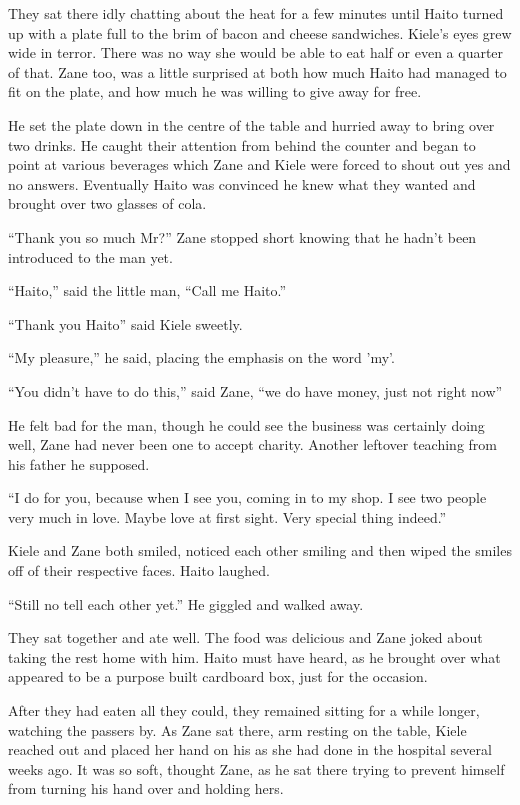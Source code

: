 They sat there idly chatting about the heat for a few minutes until Haito turned up with a plate full to the brim of bacon and cheese sandwiches.  Kiele's eyes grew wide in terror.  There was no way she would be able to eat half or even a quarter of that.  Zane too, was a little surprised at both how much Haito had managed to fit on the plate, and how much he was willing to give away for free.

He set the plate down in the centre of the table and hurried away to bring over two drinks.  He caught their attention from behind the counter and began to point at various beverages which Zane and Kiele were forced to shout out yes and no answers.  Eventually Haito was convinced he knew what they wanted and brought over two glasses of cola.  

``Thank you so much Mr?'' Zane stopped short knowing that he hadn't been introduced to the man yet.

``Haito,'' said the little man, ``Call me Haito.''

``Thank you Haito'' said Kiele sweetly.

``My pleasure,'' he said, placing the emphasis on the word 'my'.  

``You didn't have to do this,'' said Zane, ``we do have money, just not right now''

He felt bad for the man, though he could see the business was certainly doing well, Zane had never been one to accept charity.  Another leftover teaching from his father he supposed.

``I do for you, because when I see you, coming in to my shop.  I see two people very much in love.  Maybe love at first sight.  Very special thing indeed.''

Kiele and Zane both smiled, noticed each other smiling and then wiped the smiles off of their respective faces.  Haito laughed.  

``Still no tell each other yet.''  He giggled and walked away.

They sat together and ate well.  The food was delicious and Zane joked about taking the rest home with him.  Haito must have heard, as he brought over what appeared to be a purpose built cardboard box, just for the occasion.

After they had eaten all they could, they remained sitting for a while longer, watching the passers by.  As Zane sat there, arm resting on the table, Kiele reached out and placed her hand on his as she had done in the hospital several weeks ago.  It was so soft, thought Zane, as he sat there trying to prevent himself from turning his hand over and holding hers.

